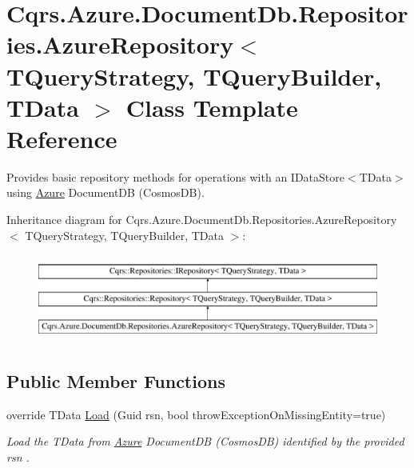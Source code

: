\hypertarget{classCqrs_1_1Azure_1_1DocumentDb_1_1Repositories_1_1AzureRepository}{}\section{Cqrs.\+Azure.\+Document\+Db.\+Repositories.\+Azure\+Repository$<$ T\+Query\+Strategy, T\+Query\+Builder, T\+Data $>$ Class Template Reference}
\label{classCqrs_1_1Azure_1_1DocumentDb_1_1Repositories_1_1AzureRepository}


Provides basic repository methods for operations with an I\+Data\+Store$<$\+T\+Data$>$ using \hyperlink{namespaceCqrs_1_1Azure}{Azure} Document\+DB (Cosmos\+DB).  


Inheritance diagram for Cqrs.\+Azure.\+Document\+Db.\+Repositories.\+Azure\+Repository$<$ T\+Query\+Strategy, T\+Query\+Builder, T\+Data $>$\+:\begin{figure}[H]
\begin{center}
\leavevmode
\includegraphics[height=2.901554cm]{classCqrs_1_1Azure_1_1DocumentDb_1_1Repositories_1_1AzureRepository}
\end{center}
\end{figure}
\subsection*{Public Member Functions}
\begin{DoxyCompactItemize}
\item 
override T\+Data \hyperlink{classCqrs_1_1Azure_1_1DocumentDb_1_1Repositories_1_1AzureRepository_a22c58163e101a6cb80f891bed6114380_a22c58163e101a6cb80f891bed6114380}{Load} (Guid rsn, bool throw\+Exception\+On\+Missing\+Entity=true)
\begin{DoxyCompactList}\small\item\em Load the {\itshape T\+Data}  from \hyperlink{namespaceCqrs_1_1Azure}{Azure} Document\+DB (Cosmos\+DB) identified by the provided {\itshape rsn} . \end{DoxyCompactList}\end{DoxyCompactItemize}
